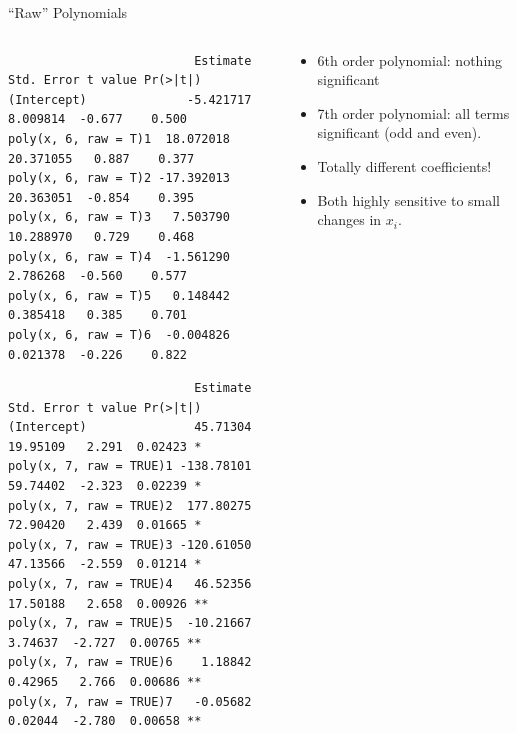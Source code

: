 \documentclass[11pt,handout,xcolor=pdftex,dvipsnames,table,mathserif,aspectratio=169]{beamer}
\begin{document}
\begin{frame}[fragile]{``Raw'' Polynomials}
\begin{columns}
\begin{column}{0.6\textwidth}
\tiny
\begin{verbatim}
                          Estimate Std. Error t value Pr(>|t|)
(Intercept)              -5.421717   8.009814  -0.677    0.500
poly(x, 6, raw = T)1  18.072018  20.371055   0.887    0.377
poly(x, 6, raw = T)2 -17.392013  20.363051  -0.854    0.395
poly(x, 6, raw = T)3   7.503790  10.288970   0.729    0.468
poly(x, 6, raw = T)4  -1.561290   2.786268  -0.560    0.577
poly(x, 6, raw = T)5   0.148442   0.385418   0.385    0.701
poly(x, 6, raw = T)6  -0.004826   0.021378  -0.226    0.822
\end{verbatim}

\begin{verbatim}
                          Estimate Std. Error t value Pr(>|t|)   
(Intercept)               45.71304   19.95109   2.291  0.02423 * 
poly(x, 7, raw = TRUE)1 -138.78101   59.74402  -2.323  0.02239 * 
poly(x, 7, raw = TRUE)2  177.80275   72.90420   2.439  0.01665 * 
poly(x, 7, raw = TRUE)3 -120.61050   47.13566  -2.559  0.01214 * 
poly(x, 7, raw = TRUE)4   46.52356   17.50188   2.658  0.00926 **
poly(x, 7, raw = TRUE)5  -10.21667    3.74637  -2.727  0.00765 **
poly(x, 7, raw = TRUE)6    1.18842    0.42965   2.766  0.00686 **
poly(x, 7, raw = TRUE)7   -0.05682    0.02044  -2.780  0.00658 **
\end{verbatim}
\end{column}
\begin{column}{0.4\textwidth}
\begin{itemize}
\item 6th order polynomial: nothing significant
\item 7th order polynomial: all terms significant (odd and even).
\item Totally different coefficients!
\item Both highly sensitive to small changes in $x_i$.
\end{itemize}
\end{column}
\end{columns}
\end{frame}
\end{document}
